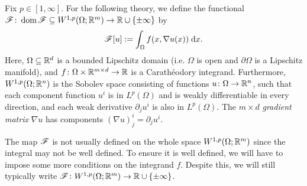 Fix $p \in [1,\infty]$. For the following theory, we define the functional $\mathscr{F} \colon \operatorname{dom}{\mathscr{F}} \subseteq W^{1,p}(\Omega;\mathbb{R}^m) \to \mathbb{R} \cup \left\{ {\pm \infty} \right\}$ by 
\begin{equation}
    \mathscr{F}[u] := \int_{\Omega} f(x,\nabla u(x)) \; \mathrm{d} x.
\end{equation}
Here, $\Omega \subseteq \mathbb{R}^d$ is a bounded Lipschitz domain (i.e. $\Omega$ is open and $\partial\Omega$ is a Lipschitz manifold), and $f \colon \Omega \times \mathbb{R}^{m \times d} \to \mathbb{R}$ is a Carath\'eodory integrand. Furthermore, $W^{1,p}(\Omega;\mathbb{R}^n)$ is the Sobolev space consisting of functions $u \colon \Omega \to \mathbb{R}^n$, such that each component function $u^i$ is in $L^p(\Omega)$ and is weakly differentiable in every direction, and each weak derivative $\partial_j u^i$ is also in $L^p(\Omega)$. The $m \times d$ \textit{gradient matrix} $\nabla u$ has components $(\nabla u)^i_j = \partial_j u^i$.
\begin{remark} 
    The map $\mathscr{F}$ is not usually defined on the whole space $W^{1,p}(\Omega;\mathbb{R}^m)$ since the integral may not be well defined. To ensure it is well defined, we will have to impose some more conditions on the integrand $f$. Despite this, we will still typically write $\mathscr{F} \colon W^{1,p}(\Omega;\mathbb{R}^m) \to \mathbb{R} \cup \left\{ {\pm \infty} \right\}$.
\end{remark}

